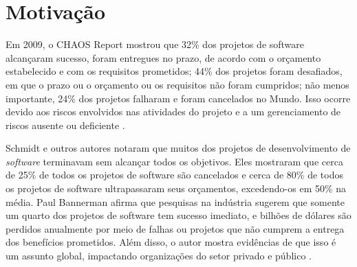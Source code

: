 \section{Motivação}

Em 2009, o CHAOS Report \cite{CHAOS2009} mostrou que 32\% dos projetos de software alcançaram sucesso, foram entregues no prazo, de acordo com o orçamento estabelecido e com os requisitos prometidos; 44\% dos projetos foram desafiados, em que o prazo ou o orçamento ou os requisitos não foram cumpridos; não menos importante, 24\% dos projetos falharam e foram cancelados no Mundo. Isso ocorre devido aos riscos envolvidos nas atividades do projeto e a um gerenciamento de riscos ausente ou deficiente \cite{ISLAM2009}. 

Schmidt e outros autores \cite{schmidt2001identifying} notaram que muitos dos projetos de desenvolvimento de \textit{software} terminavam sem alcançar todos os objetivos. Eles mostraram que cerca de 25\% de todos os projetos de software são cancelados e cerca de 80\% de todos os projetos de software ultrapassaram seus orçamentos, excedendo-os em 50\% na média. Paul Bannerman \cite{bannerman2008risk} afirma que pesquisas na indústria sugerem que somente um quarto dos projetos de software tem sucesso imediato, e bilhões de dólares são perdidos anualmente por meio de falhas ou projetos que não cumprem a entrega dos benefícios prometidos. Além disso, o autor mostra evidências de que isso é um assunto global, impactando organizações do setor privado e público \cite{KPMG2005}.

